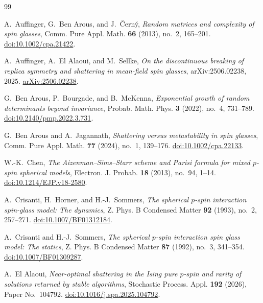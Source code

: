 \documentclass[11pt,reqno]{amsart}
\numberwithin{equation}{section}
\theoremstyle{plain}
\theoremstyle{definition}
\theoremstyle{remark}
\newcommand{\1}{\mathbf 1}
\begin{document}
\begin{thebibliography}{99}

A.~Auffinger, G.~Ben Arous, and J.~\v{C}ern\'y,
\emph{Random matrices and complexity of spin glasses},
Comm. Pure Appl. Math. \textbf{66} (2013), no.~2, 165--201.
\href{https://doi.org/10.1002/cpa.21422}{doi:10.1002/cpa.21422}.

A.~Auffinger, A.~El Alaoui, and M.~Sellke,
\emph{On the discontinuous breaking of replica symmetry and shattering
in mean-field spin glasses},
arXiv:2506.02238, 2025.
\href{https://arxiv.org/abs/2506.02238}{arXiv:2506.02238}.

G.~Ben Arous, P.~Bourgade, and B.~McKenna,
\emph{Exponential growth of random determinants beyond invariance},
Probab. Math. Phys. \textbf{3} (2022), no.~4, 731--789.
\href{https://doi.org/10.2140/pmp.2022.3.731}{doi:10.2140/pmp.2022.3.731}.

G.~Ben Arous and A.~Jagannath,
\emph{Shattering versus metastability in spin glasses},
Comm. Pure Appl. Math. \textbf{77} (2024), no.~1, 139--176.
\href{https://doi.org/10.1002/cpa.22133}{doi:10.1002/cpa.22133}.

W.-K.~Chen,
\emph{The Aizenman--Sims--Starr scheme and Parisi formula for mixed
\(p\)-spin spherical models},
Electron. J. Probab. \textbf{18} (2013), no.~94, 1--14.
\href{https://doi.org/10.1214/EJP.v18-2580}
{doi:10.1214/EJP.v18-2580}.

A.~Crisanti, H.~Horner, and H.-J.~Sommers,
\emph{The spherical \(p\)-spin interaction spin-glass model: The dynamics},
Z. Phys. B Condensed Matter \textbf{92} (1993), no.~2, 257--271.
\href{https://doi.org/10.1007/BF01312184}{doi:10.1007/BF01312184}.

A.~Crisanti and H.-J.~Sommers,
\emph{The spherical \(p\)-spin interaction spin glass model: The statics},
Z. Phys. B Condensed Matter \textbf{87} (1992), no.~3, 341--354.
\href{https://doi.org/10.1007/BF01309287}{doi:10.1007/BF01309287}.

A.~El Alaoui,
\emph{Near-optimal shattering in the Ising pure \(p\)-spin and rarity
of solutions returned by stable algorithms},
Stochastic Process. Appl. \textbf{192} (2026), Paper No.~104792.
\href{https://doi.org/10.1016/j.spa.2025.104792}
{doi:10.1016/j.spa.2025.104792}.


\end{thebibliography}
\end{document}
